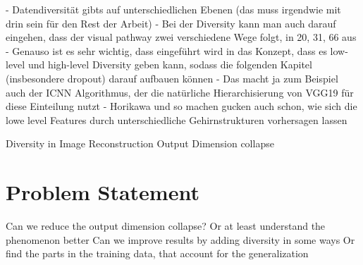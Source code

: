 - Datendiversität gibts auf unterschiedlichen Ebenen (das muss irgendwie mit drin sein für den Rest der Arbeit)
- Bei der Diversity kann man auch darauf eingehen, dass der visual pathway zwei verschiedene Wege folgt, in 20, 31, 66 aus \cite{chenExploringNaturalnessAIGenerated2023}
    - Genauso ist es sehr wichtig, dass eingeführt wird in das Konzept, dass es low-level und high-level Diversity geben kann, sodass die folgenden Kapitel (insbesondere dropout) darauf aufbauen können
    - Das macht ja zum Beispiel auch der ICNN Algorithmus, der die natürliche Hierarchisierung von VGG19 für diese Einteilung nutzt
    - Horikawa und so machen gucken auch schon, wie sich die lowe level Features durch unterschiedliche Gehirnstrukturen vorhersagen lassen

Diversity in Image Reconstruction 
    Output Dimension collapse\cite{shirakawaSpuriousReconstructionBrain2024}


\section{Problem Statement}
Can we reduce the output dimension collapse?
    Or at least understand the phenomenon better
Can we improve results by adding diversity in some ways
    Or find the parts in the training data, that account for the generalization